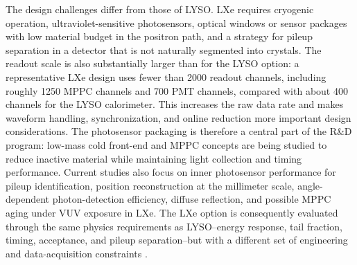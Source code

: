 The design challenges differ from those of LYSO. LXe requires cryogenic
operation, ultraviolet-sensitive photosensors, optical windows or sensor
packages with low material budget in the positron path, and a strategy for
pileup separation in a detector that is not naturally segmented into crystals.
The readout scale is also substantially larger than for the LYSO option: a
representative LXe design uses fewer than 2000 readout channels, including
roughly 1250 MPPC channels and 700 PMT channels, compared with about 400
channels for the LYSO calorimeter. This increases the raw data rate and makes
waveform handling, synchronization, and online reduction more important
design considerations. The photosensor packaging is therefore a central part
of the R\&D program: low-mass cold front-end and MPPC concepts are being
studied to reduce inactive material while maintaining light collection and
timing performance. Current studies also focus on inner photosensor
performance for pileup identification, position reconstruction at the
millimeter scale, angle-dependent photon-detection efficiency, diffuse
reflection, and possible MPPC aging under VUV exposure in LXe. The LXe option
is consequently evaluated through the same physics requirements as LYSO--energy
response, tail fraction, timing, acceptance, and pileup separation--but with a
different set of engineering and data-acquisition constraints
\cite{malbrunot_lxe_overview_2025,suzuki_lxe_cof_mppc_2025}.
\FloatBarrier
